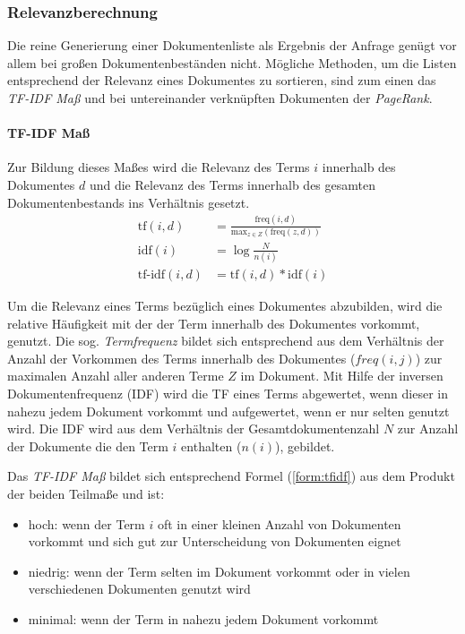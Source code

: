 \subsubsection{Relevanzberechnung}\label{sec:searchrelevance}\label{tfidf}
Die reine Generierung einer Dokumentenliste als Ergebnis der Anfrage genügt vor allem bei großen Dokumentenbeständen nicht. Mögliche Methoden, um die Listen  entsprechend der Relevanz eines Dokumentes zu sortieren, sind zum einen das \textit{TF-IDF Maß} und bei untereinander verknüpften Dokumenten der \textit{PageRank}.

\paragraph{TF-IDF Maß} Zur Bildung dieses Maßes wird die Relevanz des Terms $i$ innerhalb des Dokumentes $d$ und die Relevanz des Terms innerhalb des gesamten Dokumentenbestands ins Verhältnis gesetzt.
\begin{align}
\text{tf}(i, d) & = \frac{\text{freq}(i, d)}{\text{max}_{z \in Z}(\text{freq}(z, d))} \\
\text{idf}(i) & = \log{\frac{N}{n(i)}} \\
\text{tf-idf}(i, d) & = \text{tf}(i ,d) \ast \text{idf}(i) \label{form:tfidf}
\end{align}

Um die Relevanz eines Terms bezüglich eines Dokumentes abzubilden, wird die relative Häufigkeit mit der der Term innerhalb des Dokumentes vorkommt, genutzt. Die sog. \textit{Termfrequenz} bildet sich entsprechend aus dem Verhältnis der Anzahl der Vorkommen des Terms innerhalb des Dokumentes ($freq(i,j)$) zur maximalen Anzahl aller anderen Terme $Z$ im Dokument. Mit Hilfe der inversen Dokumentenfrequenz (\acs{IDF}) wird die \acf{TF} eines Terms abgewertet, wenn dieser in nahezu jedem Dokument vorkommt und aufgewertet, wenn er nur selten genutzt wird. Die \acs{IDF} wird aus dem Verhältnis der Gesamtdokumentenzahl $N$ zur Anzahl der Dokumente die den Term $i$ enthalten ($n(i)$), gebildet.

Das \textit{TF-IDF Maß} bildet sich entsprechend Formel (\ref{form:tfidf}) aus dem Produkt der beiden Teilmaße und ist:
\begin{itemize}
\item hoch: wenn der Term $i$ oft in einer kleinen Anzahl von Dokumenten vorkommt und sich gut zur Unterscheidung von Dokumenten eignet
\item niedrig: wenn der Term selten im Dokument vorkommt oder in vielen verschiedenen Dokumenten genutzt wird
\item minimal: wenn der Term in nahezu jedem Dokument vorkommt
\end{itemize}

